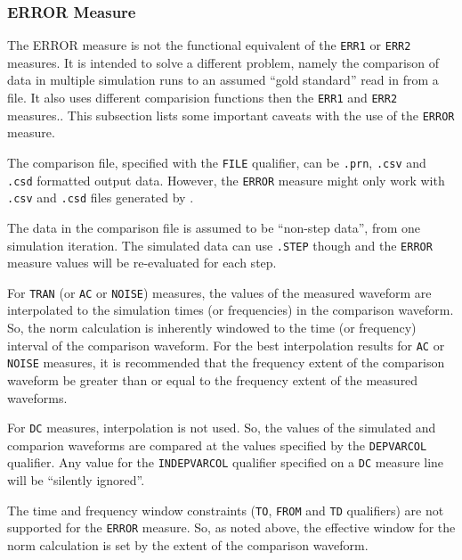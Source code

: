 \subsubsection{ERROR Measure}
\label{Measure_Error_Measure}
The \Xyce{} ERROR measure is not the functional equivalent of the \texttt{ERR1}
or \texttt{ERR2} measures.  It is intended to solve a different problem, namely
the comparison of data in multiple simulation runs to an assumed ``gold standard''
read in from a file.  It also uses different comparision functions then the
\texttt{ERR1} and \texttt{ERR2} measures..  This  subsection lists some important
caveats with the use of the \texttt{ERROR} measure.
\begin{XyceItemize}

  \item The comparison file, specified with the {\tt FILE} qualifier,
    can be {\tt .prn}, {\tt .csv} and {\tt .csd} formatted output
    data.  However, the {\tt ERROR} measure might only work with {\tt
    .csv} and {\tt .csd} files generated by \Xyce{}.  \item The data
    in the comparison file is assumed to be ``non-step data'', from
    one simulation iteration.  The simulated data can use {\tt .STEP}
    though and the {\tt ERROR} measure values will be re-evaluated for
    each step.  

  \item For {\tt TRAN} (or {\tt AC} or {\tt NOISE}) measures, the values
    of the measured waveform are interpolated to the simulation times (or
    frequencies) in the comparison waveform.  So, the norm calculation is 
    inherently windowed to the time (or frequency) interval of the comparison
    waveform.  For the best interpolation results for {\tt AC} or {\tt NOISE}
    measures, it is recommended that the frequency extent of the comparison
    waveform be greater than or equal to the frequency extent of the measured
    waveforms.

  \item For {\tt DC} measures, interpolation is not used.  So, the values
    of the simulated and comparion waveforms are compared at the
    values specified by the {\tt DEPVARCOL} qualifier.  Any value for
    the {\tt INDEPVARCOL} qualifier specified on a {\tt DC} measure
    line will be ``silently ignored''.

  \item The time and frequency window constraints ({\tt TO}, {\tt FROM} and {\tt TD}
    qualifiers) are not supported for the {\tt ERROR} measure.  So, as
    noted above, the effective window for the norm calculation is set
    by the extent of the comparison waveform.


\end{XyceItemize}
